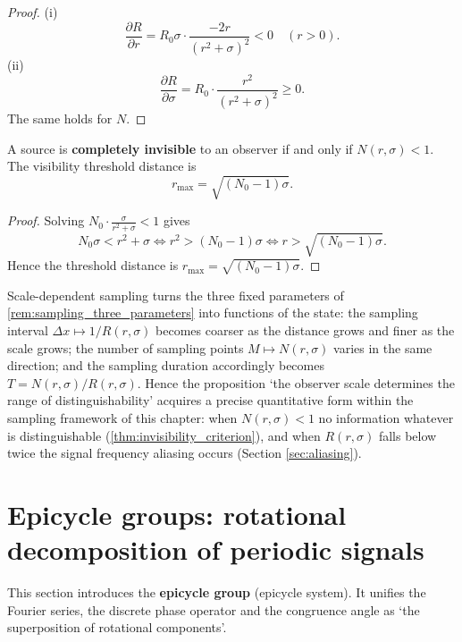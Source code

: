 \begin{proof}
(i)
\[
\frac{\partial R}{\partial r} = R_0 \sigma \cdot \frac{-2r}{(r^2 + \sigma)^2} < 0 \quad (r > 0).
\]
(ii)
\[
\frac{\partial R}{\partial \sigma} = R_0 \cdot \frac{r^2}{(r^2 + \sigma)^2} \ge 0.
\]
The same holds for $N$.
\end{proof}

\begin{theorem}\label{thm:invisibility_criterion}
A source is \textbf{completely invisible} to an observer if and only if $N(r, \sigma) < 1$. The visibility threshold distance is
\[
r_{\text{max}} = \sqrt{(N_0 - 1)\sigma}.
\]
\end{theorem}

\begin{proof}
Solving $N_0 \cdot \frac{\sigma}{r^2 + \sigma} < 1$ gives
\[
N_0\sigma < r^2+\sigma
\iff
r^2 > (N_0-1)\sigma
\iff
r > \sqrt{(N_0-1)\sigma}.
\]
Hence the threshold distance is $r_{\text{max}} = \sqrt{(N_0 - 1)\sigma}$.
\end{proof}

\begin{remark}\label{rem:dynamic_sampling_vs_three}
Scale-dependent sampling turns the three fixed parameters of \cref{rem:sampling_three_parameters} into functions of the state: the sampling interval $\Delta x\mapsto1/R(r,\sigma)$ becomes coarser as the distance grows and finer as the scale grows; the number of sampling points $M\mapsto N(r,\sigma)$ varies in the same direction; and the sampling duration accordingly becomes $T=N(r,\sigma)/R(r,\sigma)$. Hence the proposition `the observer scale determines the range of distinguishability' acquires a precise quantitative form within the sampling framework of this chapter: when $N(r,\sigma)<1$ no information whatever is distinguishable (\cref{thm:invisibility_criterion}), and when $R(r,\sigma)$ falls below twice the signal frequency aliasing occurs (Section \ref{sec:aliasing}).
\end{remark}

\section{Epicycle groups: rotational decomposition of periodic signals}\label{sec:epicycle_system}

This section introduces the \textbf{epicycle group} (epicycle system). It unifies the Fourier series, the discrete phase operator and the congruence angle as `the superposition of rotational components'.

